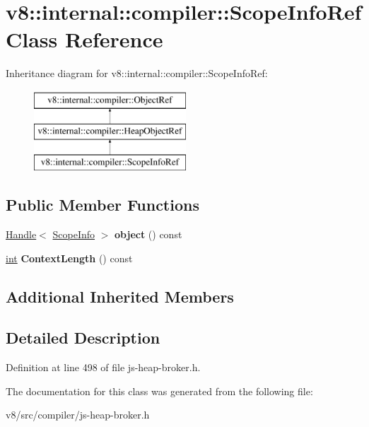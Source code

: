 \hypertarget{classv8_1_1internal_1_1compiler_1_1ScopeInfoRef}{}\section{v8\+:\+:internal\+:\+:compiler\+:\+:Scope\+Info\+Ref Class Reference}
\label{classv8_1_1internal_1_1compiler_1_1ScopeInfoRef}
Inheritance diagram for v8\+:\+:internal\+:\+:compiler\+:\+:Scope\+Info\+Ref\+:\begin{figure}[H]
\begin{center}
\leavevmode
\includegraphics[height=3.000000cm]{classv8_1_1internal_1_1compiler_1_1ScopeInfoRef}
\end{center}
\end{figure}
\subsection*{Public Member Functions}
\begin{DoxyCompactItemize}
\item 
\mbox{\label{classv8_1_1internal_1_1compiler_1_1ScopeInfoRef_a1f043d8cd8f67e41e4bb43bc9b0c139c}} 
\mbox{\hyperlink{classv8_1_1internal_1_1Handle}{Handle}}$<$ \mbox{\hyperlink{classv8_1_1internal_1_1ScopeInfo}{Scope\+Info}} $>$ {\bfseries object} () const
\item 
\mbox{\label{classv8_1_1internal_1_1compiler_1_1ScopeInfoRef_ad82498926abd5d1a60d8149dd5caa19b}} 
\mbox{\hyperlink{classint}{int}} {\bfseries Context\+Length} () const
\end{DoxyCompactItemize}
\subsection*{Additional Inherited Members}


\subsection{Detailed Description}


Definition at line 498 of file js-\/heap-\/broker.\+h.



The documentation for this class was generated from the following file\+:\begin{DoxyCompactItemize}
\item 
v8/src/compiler/js-\/heap-\/broker.\+h\end{DoxyCompactItemize}
